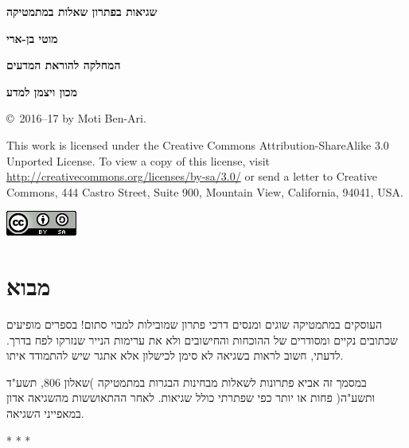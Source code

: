 \documentclass[12pt,a4paper]{article}
\begin{document}
\thispagestyle{empty}

\begin{center}
\textbf{\Huge שגיאות בפתרון שאלות במתמטיקה}

\bigskip
\bigskip

\textbf{\Large מוטי בן-ארי}

\bigskip

\textbf{\Large המחלקה להוראת המדעים}

\bigskip

\textbf{\Large מכון ויצמן למדע}

\end{center}

\bigskip


\begin{center}
\copyright{}\  2016--17 by Moti Ben-Ari.
\end{center}

This work is licensed under the Creative Commons Attribution-ShareAlike 3.0 Unported License. To view a copy of this license, visit \url{http://creativecommons.org/licenses/by-sa/3.0/} or send a letter to Creative Commons, 444 Castro Street, Suite 900, Mountain View, California, 94041, USA.

\bigskip

\begin{center}
\includegraphics[width=.2\textwidth]{../by-sa.png}
\end{center}


\section*{מבוא}


העוסקים במתמטיקה שוגים ומנסים דרכי פתרון שמובילות למבוי סתום! בספרים מופיעים שכתובים נקיים ומסודרים של ההוכחות והחישובים ולא את ערימות הנייר שנזרקו לפח בדרך. לדעתי, חשוב לראות בשגיאה לא סימן לכישלון אלא אתגר שיש להתמודד איתו.

\bigskip

במסמך זה אביא פתרונות לשאלות מבחינות הבגרות במתמטיקה )שאלון
$806$,
תשע"ד ותשע"ה( פחות או יותר כפי שפתרתי כולל שגיאות. לאחר ההתאוששות מהשגיאה אדון במאפייני השגיאה.


\begin{center}
* * *
\end{center}
\end{document}
